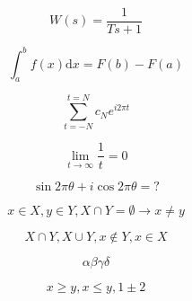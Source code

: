 \documentclass[a4paper,12pt]{article}
\begin{document}
\begin{equation}
    W(s) = \frac{1}{Ts+1}
\end{equation}

\begin{equation}
    \int_a^b{f(x)\mathrm{d}x} = F(b)-F(a)
\end{equation}

\begin{equation}
    \sum_{t=-N}^{t=N}{c_N e^{i 2 \pi t}}
\end{equation}

\begin{equation}
    \lim_{t \to \infty}{\frac{1}{t}} = 0
\end{equation}

\begin{equation}
    \sin{2 \pi \theta} + i \cos{2 \pi \theta} = ?
\end{equation}

\begin{equation}
    x \in X, y \in Y, X \cap Y = \emptyset \rightarrow x \neq y
\end{equation}

\begin{equation}
    X \cap Y, X \cup Y, x \notin Y, x \in X
\end{equation}

\begin{equation}
    \alpha \beta \gamma \delta
\end{equation}

\begin{equation}
    x \geq y, x \leq y, 1 \pm 2
\end{equation}
\end{document}
